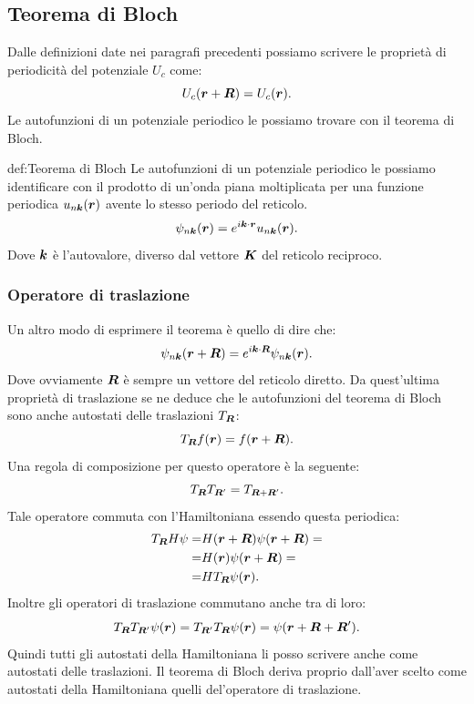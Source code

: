 \subsection{Teorema di Bloch}
\label{subsec:Teorema di Block}
Dalle definizioni date nei paragrafi precedenti possiamo scrivere le proprietà di periodicità del potenziale $U_c$ come:
\[
	U_c(\boldsymbol{r}+\boldsymbol{R}) = U_c(\boldsymbol{r})
.\]
Le autofunzioni di un potenziale periodico le possiamo trovare con il teorema di Bloch.
\begin{fact}{def:Teorema di Bloch}
	Le autofunzioni di un potenziale periodico le possiamo identificare con il 
	prodotto di un'onda piana moltiplicata per una funzione periodica
	$u_{n\boldsymbol{k}}(\boldsymbol{r})$ avente lo stesso periodo del reticolo. 
	\[
		\psi_{n\boldsymbol{k}}(\boldsymbol{r}) = e^{i\boldsymbol{k}\cdot\boldsymbol{r}}u_{n\boldsymbol{k}}(\boldsymbol{r})
	.\] 
	Dove $\boldsymbol{k}$ è l'autovalore, diverso dal vettore $\boldsymbol{K}$ del reticolo reciproco.
\end{fact}
\subsubsection{Operatore di traslazione}
\label{subsubsec:Operatore di traslazione}

Un altro modo di esprimere il teorema è quello di dire che:
\[
	\psi_{n\boldsymbol{k}}(\boldsymbol{r}+\boldsymbol{R}) = e^{i\boldsymbol{k}\cdot\boldsymbol{R}} \psi_{n\boldsymbol{k}}(\boldsymbol{r})
.\] 
Dove ovviamente $\boldsymbol{R}$ è sempre un vettore del reticolo diretto. Da quest'ultima proprietà di traslazione se ne deduce che le autofunzioni del teorema di Bloch sono anche autostati delle traslazioni $T_{\boldsymbol{R}}$:
\[
	T_{\boldsymbol{R}}f(\boldsymbol{r}) = f(\boldsymbol{r}+\boldsymbol{R})
.\] 
Una regola di composizione per questo operatore è la seguente:
\[
	T_{\boldsymbol{R}}T_{\boldsymbol{R}'}=T_{\boldsymbol{R}+\boldsymbol{R}'}
.\] 
Tale operatore commuta con l'Hamiltoniana essendo questa periodica:
\[\begin{aligned}
	T_{\boldsymbol{R}}H\psi 
	=&
	H(\boldsymbol{r}+\boldsymbol{R})\psi(\boldsymbol{r}+\boldsymbol{R}) =\\
	=&
	H(\boldsymbol{r})\psi(\boldsymbol{r}+\boldsymbol{R})=\\
	=& HT_{\boldsymbol{R}}\psi(\boldsymbol{r})
.\end{aligned}\]
Inoltre gli operatori di traslazione commutano anche tra di loro:
\[
	T_{\boldsymbol{R}}T_{\boldsymbol{R}'}\psi(\boldsymbol{r}) 
	= T_{\boldsymbol{R}'}T_{\boldsymbol{R}}\psi(\boldsymbol{r}) 
	= \psi(\boldsymbol{r}+\boldsymbol{R}+\boldsymbol{R}')
.\] 
Quindi tutti gli autostati della Hamiltoniana li posso scrivere anche come autostati delle traslazioni. Il teorema di Bloch deriva proprio dall'aver scelto come autostati della Hamiltoniana quelli del'operatore di traslazione.\\
